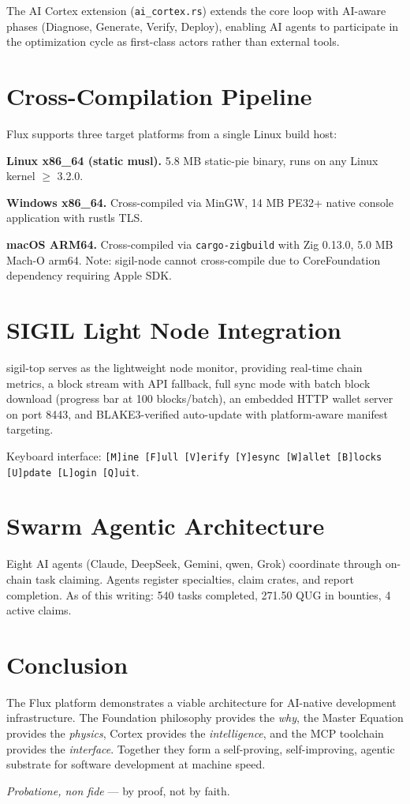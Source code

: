 \documentclass[11pt,a4paper]{article}
\begin{document}
The AI Cortex extension (\texttt{ai\_cortex.rs}) extends the core loop with AI-aware phases (Diagnose, Generate, Verify, Deploy), enabling AI agents to participate in the optimization cycle as first-class actors rather than external tools.

\section{Cross-Compilation Pipeline}

Flux supports three target platforms from a single Linux build host:

\textbf{Linux x86\_64 (static musl).} 5.8 MB static-pie binary, runs on any Linux kernel $\geq$ 3.2.0.

\textbf{Windows x86\_64.} Cross-compiled via MinGW, 14 MB PE32+ native console application with rustls TLS.

\textbf{macOS ARM64.} Cross-compiled via \texttt{cargo-zigbuild} with Zig 0.13.0, 5.0 MB Mach-O arm64. Note: sigil-node cannot cross-compile due to CoreFoundation dependency requiring Apple SDK.

\section{SIGIL Light Node Integration}

sigil-top serves as the lightweight node monitor, providing real-time chain metrics, a block stream with API fallback, full sync mode with batch block download (progress bar at 100 blocks/batch), an embedded HTTP wallet server on port 8443, and BLAKE3-verified auto-update with platform-aware manifest targeting.

Keyboard interface: \texttt{[M]ine [F]ull [V]erify [Y]esync [W]allet [B]locks [U]pdate [L]ogin [Q]uit}.

\section{Swarm Agentic Architecture}

Eight AI agents (Claude, DeepSeek, Gemini, qwen, Grok) coordinate through on-chain task claiming. Agents register specialties, claim crates, and report completion. As of this writing: 540 tasks completed, 271.50 QUG in bounties, 4 active claims.

\section{Conclusion}

The Flux platform demonstrates a viable architecture for AI-native development infrastructure. The Foundation philosophy provides the \textit{why}, the Master Equation provides the \textit{physics}, Cortex provides the \textit{intelligence}, and the MCP toolchain provides the \textit{interface}. Together they form a self-proving, self-improving, agentic substrate for software development at machine speed.

\textit{Probatione, non fide} — by proof, not by faith.


\end{document}
